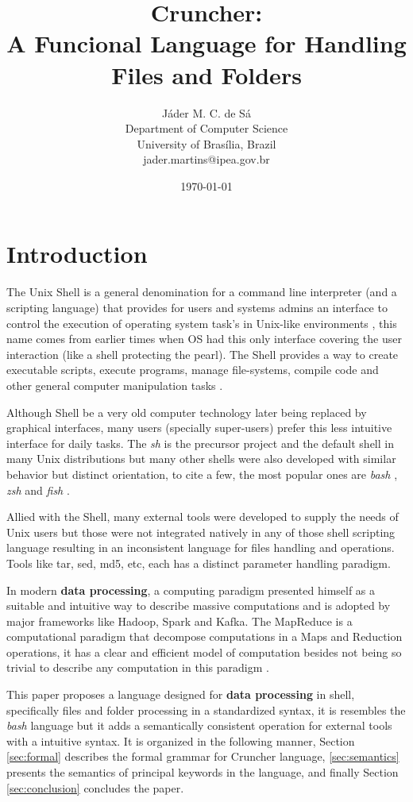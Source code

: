 \documentclass{article}
\title{Cruncher:\\
\large A Funcional Language for Handling Files and Folders}
\author{Jáder M. C. de Sá \\
        Department of Computer Science\\
        University of Brasília, Brazil \\
        jader.martins@ipea.gov.br}
\date{\today}
\begin{document}
\maketitle

\section{Introduction}
\label{sec:intro}
The Unix Shell is a general denomination for a command line interpreter
(and a scripting language) that provides for users and systems admins an
interface to control the execution of operating system task's in Unix-like
environments \cite{negus2010linux}, this name comes from earlier times
when OS had this only interface covering the user interaction (like a shell
protecting the pearl). The Shell provides a way to create executable scripts,
execute programs, manage file-systems, compile code and other general computer
manipulation tasks \cite{negus2010linux,blum2008linux}.

Although Shell be a very old computer technology later being replaced by
graphical interfaces, many users (specially super-users) prefer this less
intuitive interface \cite{newham2005learning} for daily tasks. The \textit{sh}
is the precursor project and the default shell in many Unix distributions but
many other shells were also developed with similar behavior but distinct
orientation, to cite a few, the most popular ones are \textit{bash}
\cite{bash}, \textit{zsh} \cite{zsh} and \textit{fish} \cite{fish}.

Allied with the Shell, many external tools were developed to supply the needs
of Unix users \cite{negus2010linux} but those were not integrated natively in
any of those shell scripting language resulting in an inconsistent language for
files handling and operations. Tools like tar, sed, md5, etc, each has a
distinct parameter handling paradigm.

In modern \textbf{data processing}, a computing paradigm presented himself
as a suitable and intuitive way to describe massive computations and is
adopted by major frameworks like Hadoop, Spark and Kafka. The MapReduce
is a computational paradigm that decompose computations in a Maps and
Reduction operations, it has a clear and efficient model of computation
besides not being so trivial to describe any computation in this paradigm
\cite{afrati2012vision}.

This paper proposes a language designed for \textbf{data processing} in
shell, specifically files and folder processing in a standardized syntax,
it is resembles the \textit{bash} language but it adds a semantically
consistent operation for external tools with a intuitive syntax. It is
organized in the following manner, Section \ref{sec:formal} describes the
formal grammar for Cruncher language, \ref{sec:semantics} presents the
semantics of principal keywords in the language, and finally Section
\ref{sec:conclusion} concludes the paper.
\end{document}
